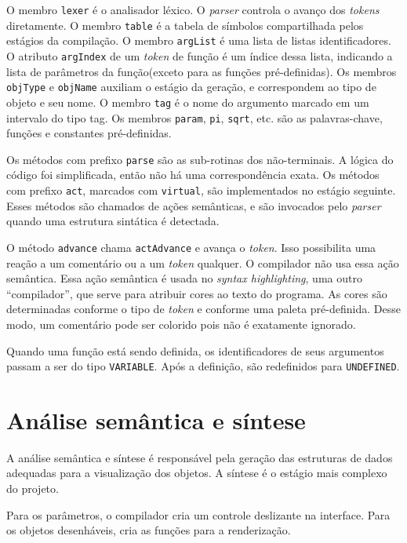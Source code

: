 O membro \texttt{lexer} é o analisador léxico.
O \textit{parser} controla o avanço dos \textit{\textit{token}s} diretamente.
O membro \texttt{table} é a tabela de símbolos compartilhada
pelos estágios da compilação.
O membro \texttt{argList} é uma lista de listas identificadores.
O atributo \texttt{argIndex} de um \textit{token} de função é um índice dessa lista,
indicando a lista de parâmetros da função(exceto para as funções pré-definidas).
Os membros \texttt{objType} e \texttt{objName} auxiliam o estágio da geração,
e correspondem ao tipo de objeto e seu nome.
O membro \texttt{tag} é o nome do argumento marcado em um intervalo do tipo tag.
Os membros \texttt{param}, \texttt{pi}, \texttt{sqrt}, etc. são
as palavras-chave, funções e constantes pré-definidas.

Os métodos com prefixo \texttt{parse} são as sub-rotinas dos não-terminais.
A lógica do código foi simplificada, então não há uma correspondência exata.
Os métodos com prefixo \texttt{act}, marcados com \texttt{virtual},
são implementados no estágio seguinte.
Esses métodos são chamados de ações semânticas,
e são invocados pelo \textit{parser} quando uma estrutura sintática é detectada.

O método \texttt{advance} chama \texttt{actAdvance} e avança o \textit{token}.
Isso possibilita uma reação a um comentário ou a um \textit{token} qualquer.
O compilador não usa essa ação semântica.
Essa ação semântica é usada no \textit{syntax highlighting},
uma outro ``compilador'', que serve para atribuir cores ao texto do programa.
As cores são determinadas conforme o tipo de \textit{token} e conforme uma 
paleta pré-definida.
Desse modo, um comentário pode ser colorido pois não é exatamente ignorado.

Quando uma função está sendo definida, os identificadores de seus argumentos
passam a ser do tipo \texttt{VARIABLE}.
Após a definição, são redefinidos para \texttt{UNDEFINED}.

\section{Análise semântica e síntese}
A análise semântica e síntese é responsável pela geração das estruturas de dados
adequadas para a visualização dos objetos.
A síntese é o estágio mais complexo do projeto.

Para os parâmetros, o compilador cria um controle deslizante na interface.
Para os objetos desenháveis, cria as funções para a renderização.

